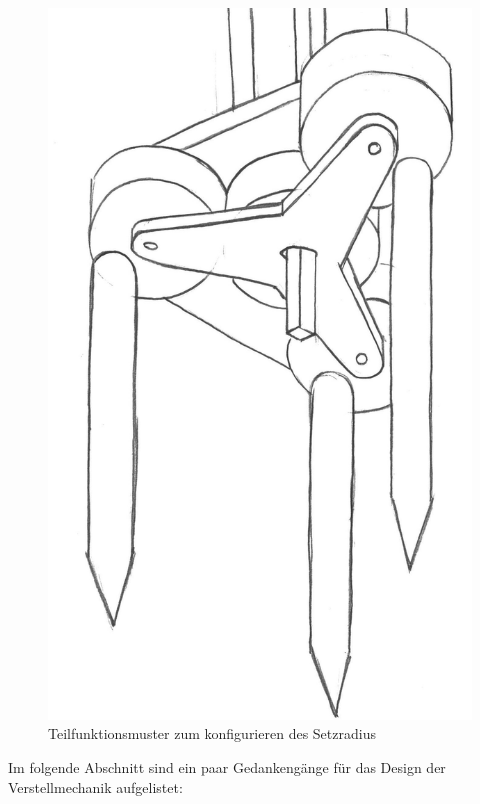 \begin{figure}[H]
	\includegraphics[scale=0.45]{Illustrationen/5-Konzept/blau_Verstellmechanismus.jpg}
	\caption{Teilfunktionsmuster zum konfigurieren des Setzradius}
	\label{fig:blau_verstellmech}
\end{figure}

Im folgende Abschnitt sind ein paar Gedankengänge für das Design der Verstellmechanik aufgelistet:

